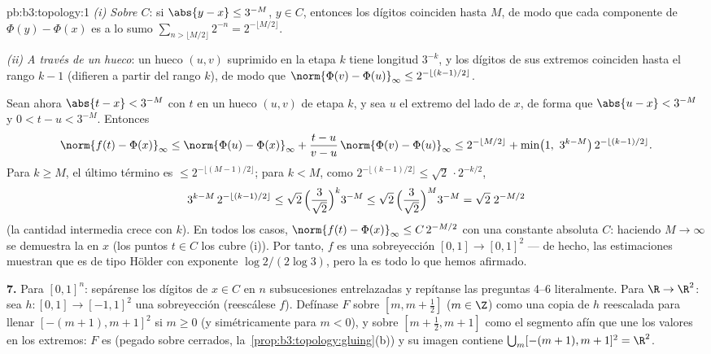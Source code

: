\begin{solution}{pb:b3:topology:1}
\emph{(i) Sobre $C$}: si $\abs{y - x} \leq 3^{-M}$, $y \in C$, entonces
los dígitos coinciden hasta $M$, de modo que cada componente de $\Phi(y)
- \Phi(x)$ es a lo sumo $\sum_{n > \lfloor M/2\rfloor} 2^{-n} =
2^{-\lfloor M/2\rfloor}$.

\emph{(ii) A través de un hueco}: un hueco $(u,v)$ suprimido en la etapa
$k$ tiene longitud $3^{-k}$, y los dígitos de sus extremos coinciden
hasta el rango $k - 1$ (difieren a partir del rango $k$), de modo que
$\norm{\Phi(v) - \Phi(u)}_\infty \leq
2^{-\lfloor (k-1)/2\rfloor}$.

Sean ahora $\abs{t - x} < 3^{-M}$ con $t$ en un hueco $(u, v)$ de etapa
$k$, y sea $u$ el extremo del lado de $x$, de forma que
$\abs{u - x} < 3^{-M}$ y $0 < t - u < 3^{-M}$. Entonces
\[
\norm{f(t) - \Phi(x)}_\infty
\leq \norm{\Phi(u) - \Phi(x)}_\infty
+ \frac{t - u}{v - u}\,\norm{\Phi(v) - \Phi(u)}_\infty
\leq 2^{-\lfloor M/2\rfloor} + \min\bigl(1,\ 3^{k - M}\bigr)\,
2^{-\lfloor(k-1)/2\rfloor} .
\]
Para $k \geq M$, el último término es $\leq 2^{-\lfloor(M-1)/2
\rfloor}$; para $k < M$, como $2^{-\lfloor(k-1)/2\rfloor} \leq
\sqrt2\,\cdot 2^{-k/2}$,
\[
3^{k-M}\,2^{-\lfloor(k-1)/2\rfloor}
\leq \sqrt2\,\Bigl(\frac{3}{\sqrt2}\Bigr)^{k} 3^{-M}
\leq \sqrt2\,\Bigl(\frac{3}{\sqrt2}\Bigr)^{M} 3^{-M}
= \sqrt2\; 2^{-M/2}
\]
(la cantidad intermedia crece con $k$). En todos los casos,
$\norm{f(t) - \Phi(x)}_\infty \leq C\,2^{-M/2}$
con una constante absoluta $C$: haciendo $M \to \infty$ se demuestra la
 en $x$ (los puntos
$t \in C$ los cubre (i)). Por tanto, $f$ es una sobreyección
 $[0,1] \to [0,1]^2$ --- de
hecho, las estimaciones muestran que es de tipo Hölder con exponente
$\log 2/(2\log
3)$, pero la  es todo lo
que hemos afirmado.

\textbf{7.} Para $[0,1]^n$: sepárense los dígitos de $x \in C$ en $n$
subsucesiones entrelazadas y repítanse las preguntas 4--6 literalmente.
Para $\R \to \R^2$: sea $h \colon [0,1] \to [-1,1]^2$ una sobreyección
 (reescálese $f$). Defínase
$F$ sobre $[m, m
+ \frac12]$ ($m \in \Z$) como una copia de $h$ reescalada para llenar
$[-(m+1), m+1]^2$ si $m \geq 0$ (y simétricamente para $m <
0$), y sobre $[m + \frac12, m + 1]$ como el segmento afín que une los
valores en los extremos: $F$ es
 (pegado sobre cerrados,
la~\cref{prop:b3:topology:gluing}(b)) y su imagen contiene
$\bigcup_m [-(m+1), m+1]^2 = \R^2$.


\end{solution}
